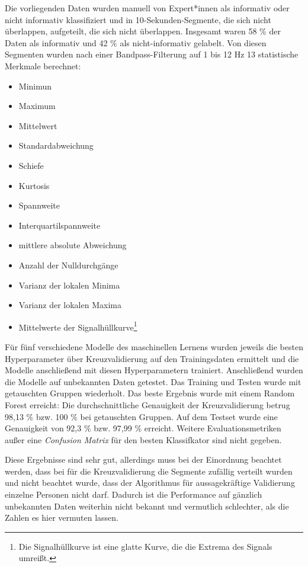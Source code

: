 	Die vorliegenden Daten wurden manuell von Expert*innen als informativ oder nicht informativ klassifiziert und in 10-Sekunden-Segmente, die sich nicht überlappen, aufgeteilt, die sich nicht überlappen. Insgesamt waren 58 \% der Daten als informativ und 42 \% als nicht-informativ gelabelt. Von diesen Segmenten wurden nach einer Bandpass-Filterung auf 1 bis 12 Hz 13 statistische Merkmale berechnet:
	\begin{itemize}
		\item Minimun
		\item Maximum
		\item Mittelwert
		\item Standardabweichung
		\item Schiefe
		\item Kurtosis
		\item Spannweite
		\item Interquartilspannweite
		\item mittlere absolute Abweichung
		\item Anzahl der Nulldurchgänge
		\item Varianz der lokalen Minima
		\item Varianz der lokalen Maxima
		\item Mittelwerte der Signalhüllkurve\footnote{Die Signalhüllkurve ist eine glatte Kurve, die die Extrema des Signals umreißt.}
	\end{itemize}
	
	Für fünf verschiedene Modelle des maschinellen Lernens wurden jeweils die besten Hyperparameter über Kreuzvalidierung auf den Trainingsdaten ermittelt und die Modelle anschließend mit diesen Hyperparametern trainiert. Anschließend wurden die Modelle auf unbekannten Daten getestet. Das Training und Testen wurde mit getauschten Gruppen wiederholt. Das beste Ergebnis wurde mit einem Random Forest erreicht: Die durchschnittliche Genauigkeit der Kreuzvalidierung betrug 98,13 \% bzw. 100 \% bei getauschten Gruppen. Auf dem Testset wurde eine Genauigkeit von 92,3 \% bzw. 97,99 \% erreicht. Weitere Evaluationsmetriken außer eine \textit{Confusion Matrix} für den besten Klassifkator sind nicht gegeben.
	
	Diese Ergebnisse sind sehr gut, allerdings muss bei der Einordnung beachtet werden, dass bei für die Kreuzvalidierung die Segmente zufällig verteilt wurden und nicht beachtet wurde, dass der Algorithmus für aussagekräftige Validierung einzelne Personen nicht darf. Dadurch ist die Performance auf gänzlich unbekannten Daten weiterhin nicht bekannt und vermutlich schlechter, als die Zahlen es hier vermuten lassen.
	
